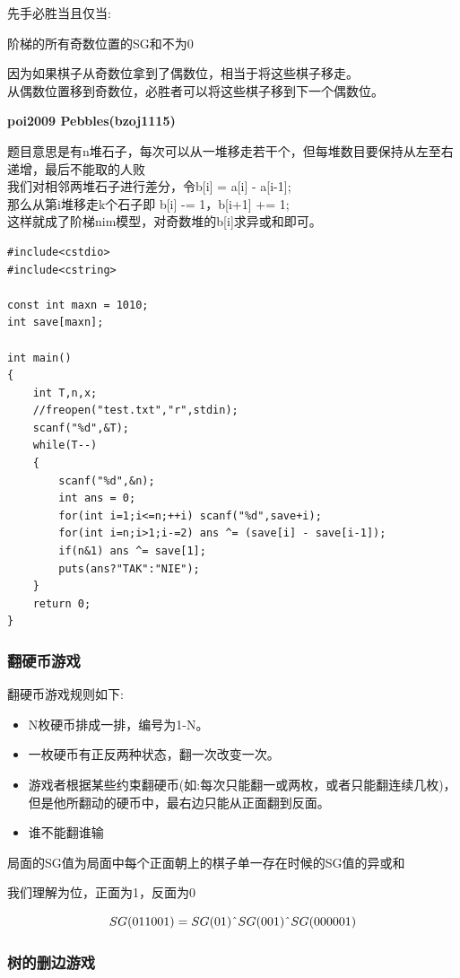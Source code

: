 \documentclass{article}
\begin{document}
先手必胜当且仅当:

阶梯的所有奇数位置的SG和不为0

因为如果棋子从奇数位拿到了偶数位，相当于将这些棋子移走。\\
从偶数位置移到奇数位，必胜者可以将这些棋子移到下一个偶数位。

\textbf{poi2009 Pebbles(bzoj1115)}

题目意思是有n堆石子，每次可以从一堆移走若干个，但每堆数目要保持从左至右递增，最后不能取的人败 \\
我们对相邻两堆石子进行差分，令b[i] = a[i] - a[i-1];	\\
那么从第i堆移走k个石子即 b[i] -= 1，b[i+1] += 1;	\\
这样就成了阶梯nim模型，对奇数堆的b[i]求异或和即可。	\\

\begin{lstlisting}
#include<cstdio>
#include<cstring>

const int maxn = 1010;
int save[maxn];

int main()
{
    int T,n,x;
    //freopen("test.txt","r",stdin);
    scanf("%d",&T);
    while(T--)
    {
        scanf("%d",&n);
        int ans = 0;
        for(int i=1;i<=n;++i) scanf("%d",save+i);
        for(int i=n;i>1;i-=2) ans ^= (save[i] - save[i-1]);
        if(n&1) ans ^= save[1];
        puts(ans?"TAK":"NIE");
    }
    return 0;
}
\end{lstlisting}

\subsubsection{翻硬币游戏}

翻硬币游戏规则如下:
\begin{itemize}
\item N枚硬币排成一排，编号为1-N。
\item 一枚硬币有正反两种状态，翻一次改变一次。
\item 游戏者根据某些约束翻硬币(如:每次只能翻一或两枚，或者只能翻连续几枚)，但是他所翻动的硬币中，最右边只能从正面翻到反面。
\item 谁不能翻谁输
\end{itemize}

局面的SG值为局面中每个正面朝上的棋子单一存在时候的SG值的异或和

我们理解为位，正面为1，反面为0

 $$SG(011001) = SG(01) \text{\^{}} SG(001) \text{\^{}} SG(000001)$$

\subsubsection{树的删边游戏}
\end{document}
